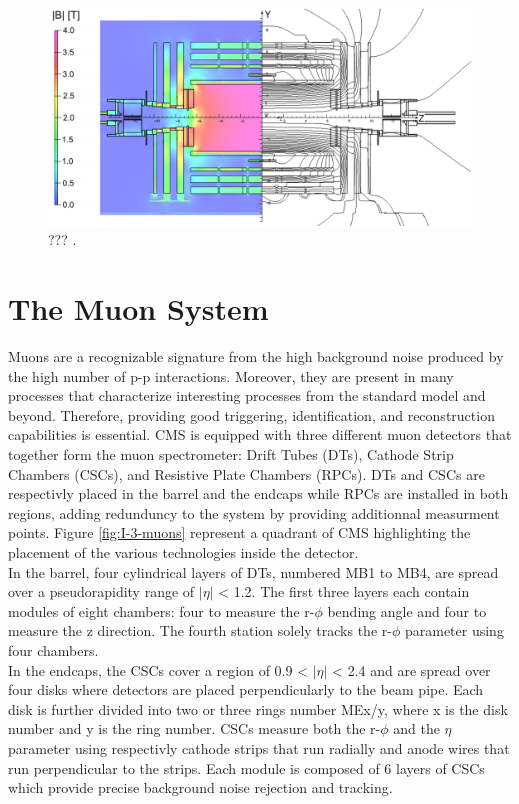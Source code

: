     \begin{figure}[h!]
      \centering
      \includegraphics[width=\textwidth]{img/I-3-cms/magnet.png}
      \caption{??? \cite{Chatrchyan:2009si}.}
      \label{fig:I-3-cms-magnet}
    \end{figure}

  \section{The Muon System}

    Muons are a recognizable signature from the high background noise produced by the high number of p-p interactions. Moreover, they are present in many processes that characterize interesting processes from the standard model and beyond. Therefore, providing good triggering, identification, and reconstruction capabilities is essential. CMS is equipped with three different muon detectors that together form the muon spectrometer: Drift Tubes (DTs), Cathode Strip Chambers (CSCs), and Resistive Plate Chambers (RPCs). DTs and CSCs are respectivly placed in the barrel and the endcaps while RPCs are installed in both regions, adding redunduncy to the system by providing additionnal measurment points. Figure \ref{fig:I-3-muons} represent a quadrant of CMS highlighting the placement of the various technologies inside the detector. \\

    In the barrel, four cylindrical layers of DTs, numbered MB1 to MB4, are spread over a pseudorapidity range of $ | \eta | $ < 1.2. The first three layers each contain modules of eight chambers: four to measure the r-$\phi$ bending angle and four to measure the z direction. The fourth station solely tracks the r-$\phi$ parameter using four chambers. \\

    In the endcaps, the CSCs cover a region of 0.9 < $ | \eta | $ < 2.4 and are spread over four disks where detectors are placed perpendicularly to the beam pipe. Each disk is further divided into two or three rings number MEx/y, where x is the disk number and y is the ring number. CSCs measure both the r-$\phi$ and the $ \eta $ parameter using respectivly cathode strips that run radially and anode wires that run perpendicular to the strips. Each module is composed of 6 layers of CSCs which provide precise background noise rejection and tracking. \\

